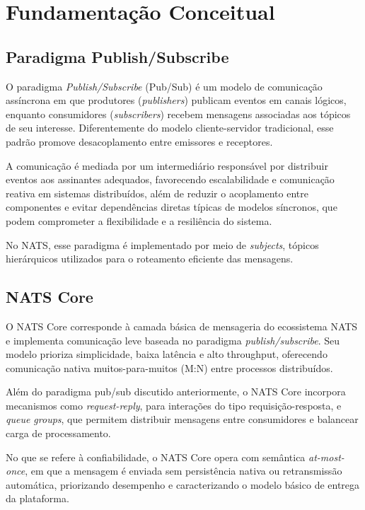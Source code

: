 \section{Fundamentação Conceitual}
\label{fundamentacao}


\subsection{Paradigma Publish/Subscribe}

O paradigma \textit{Publish/Subscribe} (Pub/Sub) é um modelo de comunicação assíncrona em que produtores (\textit{publishers}) publicam eventos em canais lógicos, enquanto consumidores (\textit{subscribers}) recebem mensagens associadas aos tópicos de seu interesse. Diferentemente do modelo cliente-servidor tradicional, esse padrão promove desacoplamento entre emissores e receptores.\cite{microsoft_pubsub}

A comunicação é mediada por um intermediário responsável por distribuir eventos aos assinantes adequados, favorecendo escalabilidade e comunicação reativa em sistemas distribuídos, além de reduzir o acoplamento entre componentes e evitar dependências diretas típicas de modelos síncronos, que podem comprometer a flexibilidade e a resiliência do sistema.

No NATS, esse paradigma é implementado por meio de \textit{subjects}, tópicos hierárquicos utilizados para o roteamento eficiente das mensagens.


\subsection{NATS Core}

O NATS Core corresponde à camada básica de mensageria do ecossistema NATS e implementa comunicação leve baseada no paradigma \textit{publish/subscribe}. Seu modelo prioriza simplicidade, baixa latência e alto throughput, oferecendo comunicação nativa muitos-para-muitos (M:N) entre processos distribuídos.

Além do paradigma pub/sub discutido anteriormente, o NATS Core incorpora mecanismos como \textit{request-reply}, para interações do tipo requisição-resposta, e \textit{queue groups}, que permitem distribuir mensagens entre consumidores e balancear carga de processamento.

No que se refere à confiabilidade, o NATS Core opera com semântica \textit{at-most-once}, em que a mensagem é enviada sem persistência nativa ou retransmissão automática, priorizando desempenho e caracterizando o modelo básico de entrega da plataforma.

